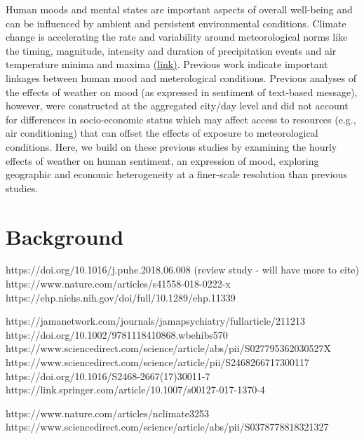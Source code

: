 \documentclass{article}
\begin{document}
Human moods and mental states are important aspects of overall well-being and can be influenced by ambient and persistent environmental conditions. Climate change is accelerating the rate and variability around meteorological norms like the timing, magnitude, intensity and duration of precipitation events and air temperature minima and maxima \href{https://www.ipcc.ch/site/assets/uploads/2018/03/SREX-Chap3_FINAL-1.pdf}{(link)}. Previous work \citep{baylis_weather_2018} indicate important linkages between human mood and meterological conditions. Previous analyses of the effects of weather on mood (as expressed in sentiment of text-based message), however, were constructed at the aggregated city/day level and did not account for differences in socio-economic status which may affect access to resources (e.g., air conditioning) that can offset the effects of exposure to meteorological conditions. Here, we build on these previous studies by examining the hourly effects of weather on human sentiment, an expression of mood, exploring geographic and economic heterogeneity at a finer-scale resolution than previous studies.  


\section{Background}
https://doi.org/10.1016/j.puhe.2018.06.008 (review study - will have more to cite)
https://www.nature.com/articles/s41558-018-0222-x
https://ehp.niehs.nih.gov/doi/full/10.1289/ehp.11339

https://jamanetwork.com/journals/jamapsychiatry/fullarticle/211213
https://doi.org/10.1002/9781118410868.wbehibs570
https://www.sciencedirect.com/science/article/abs/pii/S027795362030527X
https://www.sciencedirect.com/science/article/pii/S2468266717300117
https://doi.org/10.1016/S2468-2667(17)30011-7
https://link.springer.com/article/10.1007/s00127-017-1370-4

https://www.nature.com/articles/nclimate3253
https://www.sciencedirect.com/science/article/abs/pii/S0378778818321327




\end{document}
